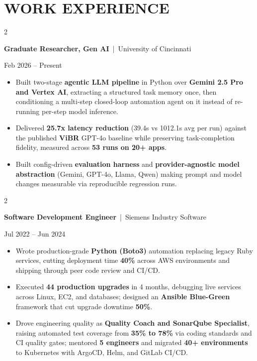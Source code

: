 \documentclass[10pt, letterpaper]{article}
\newenvironment{highlights}{
    \begin{itemize}[
        topsep=0.10 cm,
        parsep=0.06 cm,
        partopsep=0pt,
        itemsep=0.06 cm,
        leftmargin=12pt
    ]
}{
    \end{itemize}
}
\newenvironment{twocolentry}[2][]{
    \onecolentry
    \def\secondColumn{#2}
    \setcolumnwidth{\fill, 4.5 cm}
    \begin{paracol}{2}
}{
    \switchcolumn \raggedleft \secondColumn
    \end{paracol}
    \endonecolentry
}
\begin{document}
\section{WORK EXPERIENCE}
\begin{twocolentry}{Feb 2026 -- Present}
\textbf{Graduate Researcher, Gen AI} \,|\, University of Cincinnati
\end{twocolentry}
\begin{highlights}
  \item Built two-stage \textbf{agentic LLM pipeline} in Python over \textbf{Gemini 2.5 Pro and Vertex AI}, extracting a structured task memory once, then conditioning a multi-step closed-loop automation agent on it instead of re-running per-step model inference.
  \item Delivered \textbf{25.7x latency reduction} (39.4s vs 1012.1s avg per run) against the published \textbf{ViBR} GPT-4o baseline while preserving task-completion fidelity, measured across \textbf{53 runs on 20+ apps}.
  \item Built config-driven \textbf{evaluation harness} and \textbf{provider-agnostic model abstraction} (Gemini, GPT-4o, Llama, Qwen) making prompt and model changes measurable via reproducible regression runs.
\end{highlights}

\vspace{0.15 cm}

\begin{twocolentry}{Jul 2022 -- Jun 2024}
\textbf{Software Development Engineer} \,|\, Siemens Industry Software
\end{twocolentry}
\begin{highlights}
  \item Wrote production-grade \textbf{Python (Boto3)} automation replacing legacy Ruby services, cutting deployment time \textbf{40\%} across AWS environments and shipping through peer code review and CI/CD.
  \item Executed \textbf{44 production upgrades} in 4 months, debugging live services across Linux, EC2, and databases; designed an \textbf{Ansible Blue-Green} framework that cut upgrade downtime \textbf{50\%}.
  \item Drove engineering quality as \textbf{Quality Coach and SonarQube Specialist}, raising automated test coverage from \textbf{35\% to 78\%} via coding standards and CI quality gates; mentored \textbf{5 engineers} and migrated \textbf{40+ environments} to Kubernetes with ArgoCD, Helm, and GitLab CI/CD.
\end{highlights}
\end{document}
